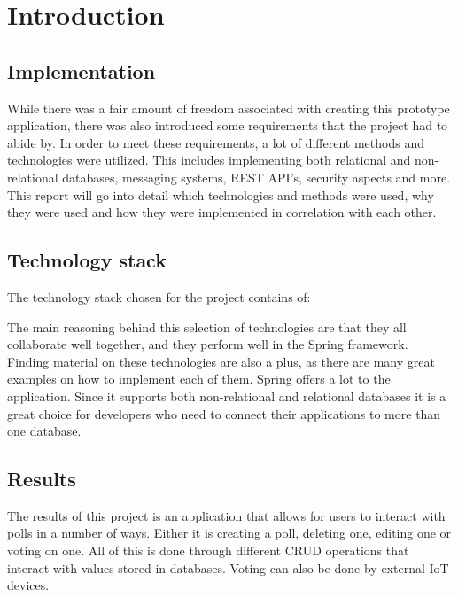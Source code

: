 \section{Introduction}
\label{sec:introduction}

\subsection{Implementation}
\label{sub:implementation} While there was a fair amount of freedom associated with creating this prototype application, there was also introduced some requirements that the project had to abide by. In order to meet these requirements, a lot of different methods and technologies were utilized. This includes implementing both relational and non-relational databases, messaging systems, REST API’s, security aspects and more. This report will go into detail which technologies and methods were used, why they were used and how they were implemented in correlation with each other.

\subsection{Technology stack}
\label{sub:techstack}
The technology stack chosen for the project contains of:
\begin{description}[noitemsep]
    \item[Firebase]
    \item[RabbitMQ]
    \item[Spring framework]
    \item[Dweet.io]
    \item[H2 Database]
\end{description}
The main reasoning behind this selection of technologies are that they all collaborate well together, and they perform well in the Spring framework. Finding material on these technologies are also a plus, as there are many great examples on how to implement each of them. Spring offers a lot to the application. Since it supports both non-relational and relational databases it is a great choice for developers who need to connect their applications to more than one database. 
\subsection{Results}
\label{sub:results}The results of this project is an application that allows for users to interact with polls in a number of ways. Either it is creating a poll, deleting one, editing one or voting on one. All of this is done through different CRUD operations that interact with values stored in databases. Voting can also be done by external IoT devices. 


